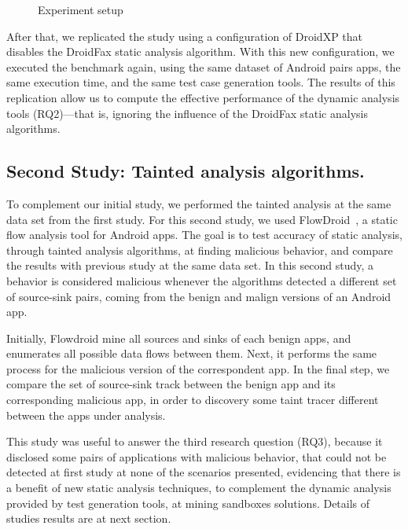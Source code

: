 \begin{figure}[ht]
   \label{Experiment setup}
   \caption{Experiment setup}
   \label{fig:setup}
 \end{figure}

After that, we replicated the study using a configuration of DroidXP that disables the DroidFax static analysis algorithm. With this new configuration, we executed the benchmark again, using the same dataset of Android pairs apps, the same execution time, and the same test case generation tools.
The results of this replication allow us to compute the effective performance
of the dynamic analysis tools (RQ2)---that is, ignoring the influence of the
DroidFax static analysis algorithms.

\subsection{Second Study: Tainted analysis algorithms.}

To complement our initial study, we performed the tainted analysis at the same
data set from the first study. For this second study, we used
FlowDroid~\cite{10.1145/2666356.2594299}, a static flow analysis tool for Android apps.
The goal is to test accuracy of static analysis, through tainted analysis algorithms, at finding malicious behavior, and compare the results with previous study at the same data set.
In this second study, a behavior is considered malicious whenever the algorithms
detected a different set of source-sink pairs, coming from the benign and malign
versions of an Android app. 

Initially, Flowdroid mine all sources and sinks of each benign apps, and enumerates all possible data flows between them. Next, it performs the same process for the malicious version
of the correspondent app. In the final step, we compare the set of source-sink track between the benign app and its corresponding malicious app, in order to discovery some taint tracer different between the apps under analysis.

This study was useful to answer the third research question (RQ3), because it disclosed some pairs of applications with malicious behavior, that could not be detected at first study at none of the scenarios presented, evidencing that there is a benefit of new static analysis techniques, to complement the dynamic analysis provided by test generation tools, at mining sandboxes solutions. Details of studies results are at next section.





